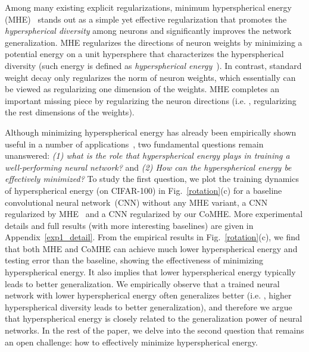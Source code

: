 \par
Among many existing explicit regularizations, minimum hyperspherical energy (MHE)~\cite{LiuNIPS18} stands out as a simple yet effective regularization that promotes the \emph{hyperspherical diversity} among neurons and significantly improves the network generalization. MHE regularizes the directions of neuron weights by minimizing a potential energy on a unit hypersphere that characterizes the hyperspherical diversity (such energy is defined as \emph{hyperspherical energy}~\cite{LiuNIPS18}). In contrast, standard weight decay only regularizes the norm of neuron weights, which essentially can be viewed as regularizing one dimension of the weights. MHE completes an important missing piece by regularizing the neuron directions (i.e. , regularizing the rest dimensions of the weights).
\par
Although minimizing hyperspherical energy has already been empirically shown useful in a number of applications~\cite{LiuNIPS18}, two fundamental questions remain unanswered: \emph{(1) what is the role that hyperspherical energy plays in training a well-performing neural network?} and \emph{(2) How can the hyperspherical energy be effectively minimized?} To study the first question, we plot the training dynamics of hyperspherical energy (on CIFAR-100) in Fig.~\ref{rotation}(c) for a baseline convolutional neural network~(CNN) without any MHE variant, a CNN regularized by MHE~\cite{LiuNIPS18} and a CNN regularized by our CoMHE. More experimental details and full results (with more interesting baselines) are given in Appendix~\ref{exp1_detail}. From the empirical results in Fig.~\ref{rotation}(c), we find that both MHE and CoMHE can achieve much lower hyperspherical energy and testing error than the baseline, showing the effectiveness of minimizing hyperspherical energy. It also implies that lower hyperspherical energy typically leads to better generalization. We empirically observe that a trained neural network with lower hyperspherical energy often generalizes better (i.e. , higher hyperspherical diversity leads to better generalization), and therefore we argue that hyperspherical energy is closely related to the generalization power of neural networks. In the rest of the paper, we delve into the second question that remains an open challenge: how to effectively minimize hyperspherical energy.


